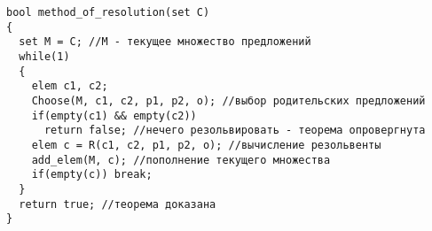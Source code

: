 \documentclass[a5paper]{article}
\begin{document}

\begin{lstlisting}
bool method_of_resolution(set C)
{
  set M = C; //M - текущее множество предложений
  while(1)
  {
    elem c1, c2;
    Choose(M, c1, c2, p1, p2, o); //выбор родительских предложений
    if(empty(c1) && empty(c2))
      return false; //нечего резольвировать - теорема опровергнута
    elem c = R(c1, c2, p1, p2, o); //вычисление резольвенты
    add_elem(M, c); //пополнение текущего множества
    if(empty(c)) break;
  }
  return true; //теорема доказана
}
\end{lstlisting}
\end{document}
